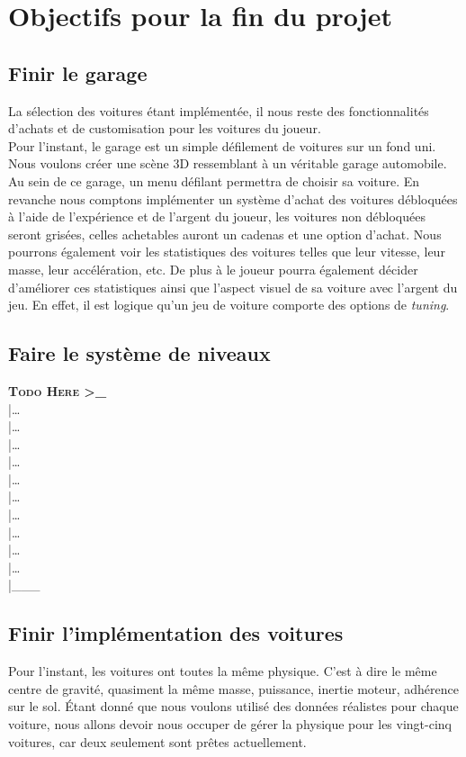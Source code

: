 \documentclass[12pt,a4paper]{article}
\begin{document}
    \section{Objectifs pour la fin du projet}
        \subsection{Finir le garage}
            La sélection des voitures étant implémentée, il nous reste des fonctionnalités
            d'achats et de customisation pour les voitures du joueur.\\
            Pour l'instant, le garage est un simple défilement de voitures sur un fond uni.
            Nous voulons créer une scène 3D ressemblant à un véritable garage automobile.
            Au sein de ce garage, un menu défilant permettra de choisir sa voiture.
            En revanche nous comptons implémenter un système d'achat des voitures débloquées
            à l'aide de l'expérience et de l'argent du joueur, les voitures non débloquées
            seront grisées, celles achetables auront un cadenas et une option d'achat.
            Nous pourrons également voir les statistiques des voitures telles que leur vitesse,
            leur masse, leur accélération, etc. De plus à le joueur pourra également décider
            d'améliorer ces statistiques ainsi que l'aspect visuel de sa voiture avec l'argent
            du jeu. En effet, il est logique qu'un jeu de voiture comporte des options de
            \textsl{tuning}.
        

        \subsection{Faire le système de niveaux}
            \textbf{\textsc{Todo Here >\_}}\\
            |\dots\\|\dots\\|\dots\\|\dots\\|\dots\\|\dots\\|\dots\\|\dots\\|\dots\\|\dots\\|\_\_\_\\
            
        \subsection{Finir l'implémentation des voitures}
           Pour l'instant, les voitures ont toutes la même physique. C'est à dire le même
           centre de gravité, quasiment la même masse, puissance, inertie moteur, adhérence sur le sol.
           Étant donné que nous voulons utilisé des données réalistes pour chaque voiture,
           nous allons devoir nous occuper de gérer la physique pour les vingt-cinq voitures,
           car deux seulement sont prêtes actuellement.
            
\end{document}
